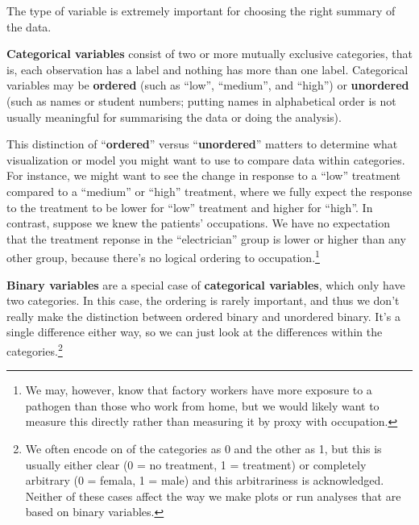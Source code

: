 \documentclass[
  letterpaper,
  DIV=11,
  numbers=noendperiod,
  oneside]{scrreprt}
\begin{document}
The type of variable is extremely important for choosing the right
summary of the data.

\textbf{Categorical variables} consist of two or more mutually exclusive
categories, that is, each observation has a label and nothing has more
than one label. Categorical variables may be \textbf{ordered} (such as
``low'', ``medium'', and ``high'') or \textbf{unordered} (such as names
or student numbers; putting names in alphabetical order is not usually
meaningful for summarising the data or doing the
analysis).{}

This distinction of ``\textbf{ordered}'' versus ``\textbf{unordered}''
matters to determine what visualization or model you might want to use
to compare data within categories. For instance, we might want to see
the change in response to a ``low'' treatment compared to a ``medium''
or ``high'' treatment, where we fully expect the response to the
treatment to be lower for ``low'' treatment and higher for ``high''. In
contrast, suppose we knew the patients' occupations. We have no
expectation that the treatment reponse in the ``electrician'' group is
lower or higher than any other group, because there's no logical
ordering to
occupation.\footnote{We may, however, know that factory workers have
  more exposure to a pathogen than those who work from home, but we
  would likely want to measure this directly rather than measuring it by
  proxy with occupation.}{}

\textbf{Binary variables} are a special case of \textbf{categorical
variables}, which only have two categories. In this case, the ordering
is rarely important, and thus we don't really make the distinction
between ordered binary and unordered binary. It's a single difference
either way, so we can just look at the differences within the
categories.\footnote{We often encode on of the categories as 0 and the
  other as 1, but this is usually either clear (0 = no treatment, 1 =
  treatment) or completely arbitrary (0 = femala, 1 = male) and this
  arbitrariness is acknowledged. Neither of these cases affect the way
  we make plots or run analyses that are based on binary variables.}{}
\end{document}
